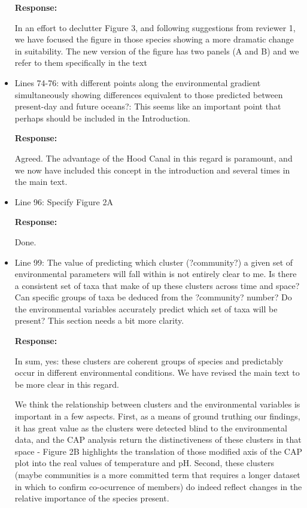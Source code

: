 \documentclass[11pt]{article}
\begin{document}
\begin{linenumbers}
\begin{itemize}
\textbf{Response:}

In an effort to declutter Figure 3, and following suggestions from reviewer 1, we have focused the figure in those species showing a more dramatic change in suitability. The new version of the figure has two panels (A and B) and we refer to them specifically in the text

\item{Lines 74-76: with different points along the environmental gradient simultaneously showing differences equivalent to those predicted between present-day and future oceans?: This seems like an important point that perhaps should be included in the Introduction.}

\textbf{Response:}

Agreed. The advantage of the Hood Canal in this regard is paramount, and we now have included this concept in the introduction and several times in the main text.

\item{Line 96: Specify Figure 2A}

\textbf{Response:}

Done.

\item{Line 99: The value of predicting which cluster (?community?) a given set of environmental parameters will fall within is not entirely clear to me. Is there a consistent set of taxa that make of up these clusters across time and space? Can specific groups of taxa be deduced from the ?community? number? Do the environmental variables accurately predict which set of taxa will be present? This section needs a bit more clarity.}

\textbf{Response:}

In sum, yes: these clusters are coherent groups of species and predictably occur in different environmental conditions. We have revised the main text to be more clear in this regard. 

We think the relationship between clusters and the environmental variables is important in a few aspects. First, as a means of ground truthing our findings, it has great value as the clusters were detected blind to the environmental data, and the CAP analysis return the distinctiveness of these clusters in that space - Figure 2B highlights the translation of those modified axis of the CAP plot into the real values of temperature and pH. Second, these clusters (maybe communities is a more committed term that requires a longer dataset in which to confirm co-ocurrence of members) do indeed reflect changes in the relative importance of the species present.


\end{itemize}
\end{linenumbers}
\end{document}
